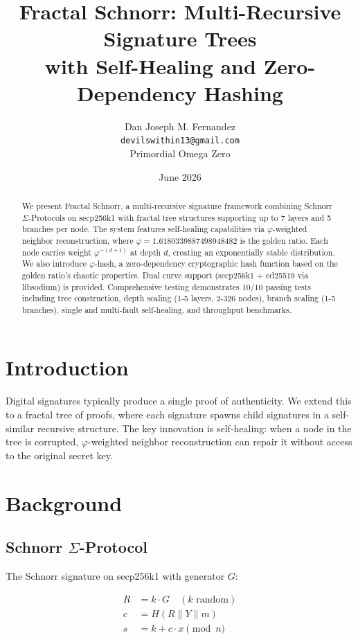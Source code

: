 \documentclass{article}
\title{Fractal Schnorr: Multi-Recursive Signature Trees\\
with Self-Healing and Zero-Dependency Hashing}
\author{Dan Joseph M. Fernandez\\
\texttt{devilswithin13@gmail.com}\\
Primordial Omega Zero}
\date{June 2026}
\begin{document}
\maketitle

\begin{abstract}
We present Fractal Schnorr, a multi-recursive signature framework combining Schnorr $\Sigma$-Protocols on secp256k1 with fractal tree structures supporting up to 7 layers and 5 branches per node. The system features self-healing capabilities via $\varphi$-weighted neighbor reconstruction, where $\varphi = 1.6180339887498948482$ is the golden ratio. Each node carries weight $\varphi^{-(d+1)}$ at depth $d$, creating an exponentially stable distribution. We also introduce $\varphi$-hash, a zero-dependency cryptographic hash function based on the golden ratio's chaotic properties. Dual curve support (secp256k1 + ed25519 via libsodium) is provided. Comprehensive testing demonstrates 10/10 passing tests including tree construction, depth scaling (1-5 layers, 2-326 nodes), branch scaling (1-5 branches), single and multi-fault self-healing, and throughput benchmarks.
\end{abstract}

\section{Introduction}

Digital signatures typically produce a single proof of authenticity. We extend this to a fractal tree of proofs, where each signature spawns child signatures in a self-similar recursive structure. The key innovation is self-healing: when a node in the tree is corrupted, $\varphi$-weighted neighbor reconstruction can repair it without access to the original secret key.

\section{Background}

\subsection{Schnorr $\Sigma$-Protocol}

The Schnorr signature on secp256k1 with generator $G$:

\begin{align}
R &= k \cdot G \quad (k \text{ random})\\
c &= H(R \parallel Y \parallel m)\\
s &= k + c \cdot x \pmod{n}
\end{align}
\end{document}
